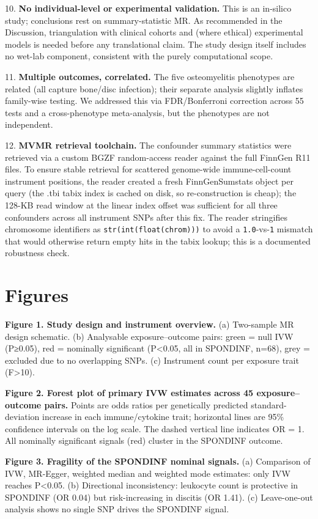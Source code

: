 \documentclass[11pt]{article}
\begin{document}
10. \textbf{No individual-level or experimental validation.} This is an in-silico study; conclusions rest on summary-statistic MR. As recommended in the Discussion, triangulation with clinical cohorts and (where ethical) experimental models is needed before any translational claim. The study design itself includes no wet-lab component, consistent with the purely computational scope.

11. \textbf{Multiple outcomes, correlated.} The five osteomyelitis phenotypes are related (all capture bone/disc infection); their separate analysis slightly inflates family-wise testing. We addressed this via FDR/Bonferroni correction across 55 tests and a cross-phenotype meta-analysis, but the phenotypes are not independent.

12. \textbf{MVMR retrieval toolchain.} The confounder summary statistics were retrieved via a custom BGZF random-access reader against the full FinnGen R11 files. To ensure stable retrieval for scattered genome-wide immune-cell-count instrument positions, the reader created a fresh FinnGenSumstats object per query (the .tbi tabix index is cached on disk, so re-construction is cheap); the 128-KB read window at the linear index offset was sufficient for all three confounders across all instrument SNPs after this fix. The reader stringifies chromosome identifiers as \texttt{str(int(float(chrom)))} to avoid a \texttt{1.0}-vs-\texttt{1} mismatch that would otherwise return empty hits in the tabix lookup; this is a documented robustness check.

\section*{Figures}
\textbf{Figure 1. Study design and instrument overview.} (a) Two-sample MR design schematic. (b) Analysable exposure--outcome pairs: green = null IVW (P≥0.05), red = nominally significant (P<0.05, all in SPONDINF, n=68), grey = excluded due to no overlapping SNPs. (c) Instrument count per exposure trait (F>10).

\textbf{Figure 2. Forest plot of primary IVW estimates across 45 exposure--outcome pairs.} Points are odds ratios per genetically predicted standard-deviation increase in each immune/cytokine trait; horizontal lines are 95\% confidence intervals on the log scale. The dashed vertical line indicates OR = 1. All nominally significant signals (red) cluster in the SPONDINF outcome.

\textbf{Figure 3. Fragility of the SPONDINF nominal signals.} (a) Comparison of IVW, MR-Egger, weighted median and weighted mode estimates: only IVW reaches P<0.05. (b) Directional inconsistency: leukocyte count is protective in SPONDINF (OR 0.04) but risk-increasing in discitis (OR 1.41). (c) Leave-one-out analysis shows no single SNP drives the SPONDINF signal.
\end{document}

